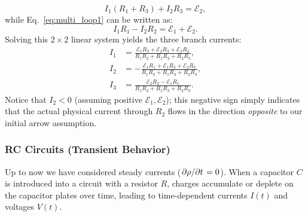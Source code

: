 \begin{example}
\begin{enumerate}
    \begin{equation*}
        I_1 (R_1 + R_3) + I_2 R_3 = \mathcal{E}_2,
    \end{equation*}
    while Eq.~\eqref{eq:multi_loop1} can be written as:
    \begin{equation*}
        I_1 R_1 - I_2 R_2 = \mathcal{E}_1 + \mathcal{E}_2.
    \end{equation*}
    Solving this $2 \times 2$ linear system yields the three branch currents:
    \begin{align}
        I_1 &= \frac{\mathcal{E}_1 R_3 + \mathcal{E}_2 R_3 + \mathcal{E}_2 R_2}{R_1 R_2 + R_1 R_3 + R_2 R_3}, \\
        I_2 &= -\frac{\mathcal{E}_1 R_1 + \mathcal{E}_1 R_3 + \mathcal{E}_2 R_3}{R_1 R_2 + R_1 R_3 + R_2 R_3}, \\
        I_3 &= \frac{\mathcal{E}_2 R_2 - \mathcal{E}_1 R_1}{R_1 R_2 + R_1 R_3 + R_2 R_3}.
    \end{align}
    Notice that $I_2 < 0$ (assuming positive $\mathcal{E}_1, \mathcal{E}_2$); this negative sign simply indicates that the actual physical current through $R_2$ flows in the direction \emph{opposite} to our initial arrow assumption.
\end{enumerate}
\end{example}

\subsubsection{RC Circuits (Transient Behavior)}

Up to now we have considered steady currents ($\pdv*{\rho}{t} = 0$). When a capacitor $C$ is introduced into a circuit with a resistor $R$, charges accumulate or deplete on the capacitor plates over time, leading to time-dependent currents $I(t)$ and voltages $V(t)$.

